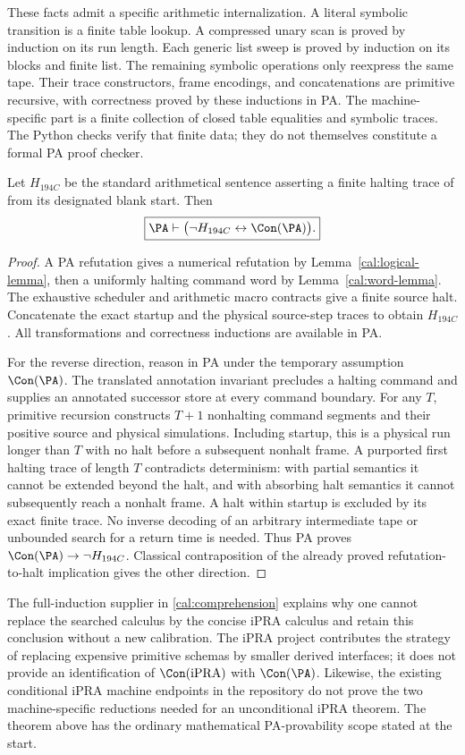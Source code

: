 These facts admit a specific arithmetic internalization.  A literal
symbolic transition is a finite table lookup.  A compressed unary scan
is proved by induction on its run length.  Each generic list sweep
is proved by induction on its blocks and finite list.  The remaining
symbolic operations only reexpress the same tape.  Their trace
constructors, frame encodings, and concatenations are primitive
recursive, with correctness proved by these inductions in PA.
The machine-specific part is a finite collection of closed table
equalities and symbolic traces.  The Python checks verify that finite
data; they do not themselves constitute a formal PA proof checker.

\begin{theorem}
\label{cal:main-theorem}
Let $H_{194C}$ be the standard arithmetical sentence asserting a finite
halting trace of  from its designated
blank start.  Then
\[
 \boxed{\PA\vdash
       \bigl(\neg H_{194C}\leftrightarrow\Con(\PA)\bigr).}
\]
\end{theorem}

\begin{proof}
A PA refutation gives a numerical refutation by
Lemma~\ref{cal:logical-lemma}, then a uniformly halting command word
by Lemma~\ref{cal:word-lemma}.  The exhaustive scheduler and arithmetic
macro contracts give a finite source halt.  Concatenate the exact
startup and the physical source-step traces to obtain $H_{194C}$.
All transformations and correctness inductions are available in PA.

For the reverse direction, reason in PA under the temporary assumption
$\Con(\PA)$.  The translated annotation invariant precludes a
halting command and supplies an annotated successor store at every
command boundary.  For any $T$, primitive recursion constructs
$T+1$ nonhalting command segments and their positive source and
physical simulations.  Including startup, this is a physical run
longer than $T$ with no halt before a subsequent nonhalt frame.
A purported first halting trace of length $T$ contradicts determinism:
with partial semantics it cannot be extended beyond the halt, and
with absorbing halt semantics it cannot subsequently reach a
nonhalt frame.  A halt within startup is excluded by its exact
finite trace.  No inverse decoding of an arbitrary intermediate
tape or unbounded search for a return time is needed.
Thus PA proves $\Con(\PA)\to\neg H_{194C}$.  Classical contraposition
of the already proved refutation-to-halt implication gives the other
direction.
\end{proof}

The full-induction supplier in \eqref{cal:comprehension} explains why
one cannot replace the searched calculus by the concise iPRA calculus
and retain this conclusion without a new calibration.  The iPRA
project contributes the strategy of replacing expensive primitive
schemas by smaller derived interfaces; it does not provide an
identification of $\Con(\mathrm{iPRA})$ with $\Con(\PA)$.
Likewise, the existing conditional iPRA machine endpoints in the
repository do not prove the two machine-specific reductions needed
for an unconditional iPRA theorem.  The theorem above has the
ordinary mathematical PA-provability scope stated at the start.
